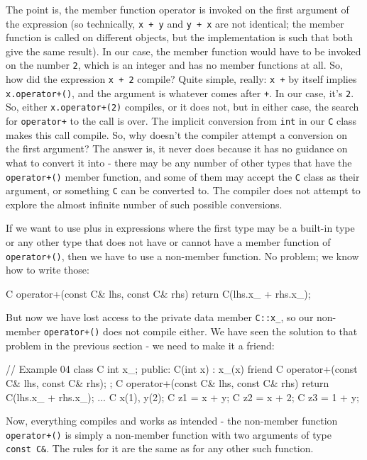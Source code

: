 The point is, the member function operator is invoked on the first argument of the expression (so technically, \texttt{x\ +\ y} and \texttt{y\ +\ x} are not identical; the member function is called on different objects, but the implementation is such that both give the same result). In our case, the member function would have to be invoked on the number \texttt{2}, which is an integer and has no member functions at all. So, how did the expression \texttt{x\ +\ 2} compile? Quite simple, really: \texttt{x\ +} by itself implies \texttt{x.operator+()}, and the argument is whatever comes after \texttt{+}. In our case, it's \texttt{2}. So, either \texttt{x.operator+(2)} compiles, or it does not, but in either case, the search for \texttt{operator+} to the call is over. The implicit conversion from \texttt{int} in our \texttt{C} class makes this call compile. So, why doesn't the compiler attempt a conversion on the first argument? The answer is, it never does because it has no guidance on what to convert it into - there may be any number of other types that have the \texttt{operator+()} member function, and some of them may accept the \texttt{C} class as their argument, or something \texttt{C} can be converted to. The compiler does not attempt to explore the almost infinite number of such possible conversions.

If we want to use plus in expressions where the first type may be a built-in type or any other type that does not have or cannot have a member function of \texttt{operator+()}, then we have to use a non-member function. No problem; we know how to write those:

\begin{code}
C operator+(const C& lhs, const C& rhs) {
  return C(lhs.x_ + rhs.x_);
}
\end{code}

But now we have lost access to the private data member \texttt{C::x\_}, so our non-member \texttt{operator+()} does not compile either. We have seen the solution to that problem in the previous section - we need to make it a friend:

\begin{code}
// Example 04
class C {
  int x_;
  public:
  C(int x) : x_(x) {}
  friend C operator+(const C& lhs, const C& rhs);
};
C operator+(const C& lhs, const C& rhs) {
  return C(lhs.x_ + rhs.x_);
}
...
C x(1), y(2);
C z1 = x + y;
C z2 = x + 2;
C z3 = 1 + y;
\end{code}

Now, everything compiles and works as intended - the non-member function \texttt{operator+()} is simply a non-member function with two arguments of type \texttt{const\ C\&}. The rules for it are the same as for any other such function.

